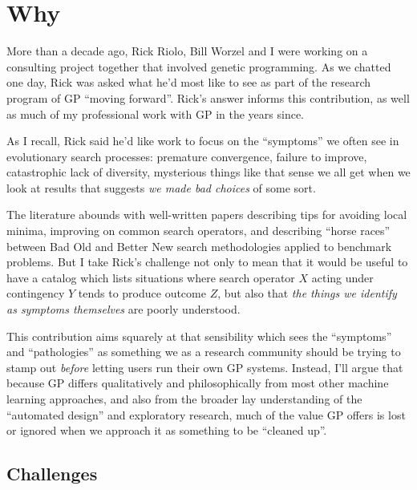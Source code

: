 
\section{Why}\hypertarget{why}{}\label{why}

More than a decade ago, Rick Riolo, Bill Worzel and I were working on a consulting project together that involved genetic programming. As we chatted one day, Rick was asked what he'd most like to see as part of the research program of GP ``moving forward''. Rick's answer informs this contribution, as well as much of my professional work with GP in the years since.

As I recall, Rick said he'd like work to focus on the ``symptoms'' we often see in evolutionary search processes: premature convergence, failure to improve, catastrophic lack of diversity, mysterious things like that sense we all get when we look at results that suggests \emph{we made bad choices} of some sort.

The literature abounds with well-written papers describing tips for avoiding local minima, improving on common search operators, and describing ``horse races'' between Bad Old and Better New search methodologies applied to benchmark problems. But I take Rick's challenge not only to mean that it would be useful to have a catalog which lists situations where search operator $X$ acting under contingency $Y$ tends to produce outcome $Z$, but also that \emph{the things we identify as symptoms themselves} are poorly understood.

This contribution aims squarely at that sensibility which sees the ``symptoms'' and ``pathologies'' as something we as a research community should be trying to stamp out \emph{before} letting users run their own GP systems. Instead, I'll argue that because GP differs qualitatively and philosophically from most other machine learning approaches, and also from the broader lay understanding of the ``automated design'' and exploratory research, much of the value GP offers is lost or ignored when we approach it as something to be ``cleaned up''.

\subsection{Challenges}\hypertarget{challenges}{}\label{challenges}

